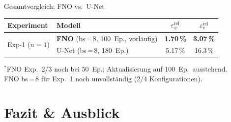 \documentclass[aspectratio=169]{beamer}
\begin{document}
\begin{frame}{Gesamtvergleich: FNO vs.\ U-Net}
  \begin{center}
    \renewcommand{\arraystretch}{1.45}
    \begin{tabular}{llcc}
      \toprule
      Experiment & Modell & $\varepsilon_\psi^{\text{rel}}$ & $\varepsilon_v^{\text{rel}}$ \\
      \midrule
      \multirow{2}{*}{Exp-1 ($n=1$)}
        & \textbf{FNO} (bs\,=\,8, 100~Ep., vorläufig)
          & \textcolor{bestgreen}{\textbf{1.70\,\%}} & \textcolor{bestgreen}{\textbf{3.07\,\%}} \\
        & U-Net (bs\,=\,8, 180~Ep.)
          & 5.17\,\% & 16.3\,\% \\
    \end{tabular}
  \end{center}
  \vspace{4pt}
  \small
  ${}^*$FNO Exp.~2/3 noch bei 50~Ep.; Aktualisierung auf 100~Ep.\ ausstehend.\\
  FNO bs\,=\,8 für Exp.~1 noch unvollständig (2/4 Konfigurationen).
\end{frame}

\section{Fazit \& Ausblick}
\end{document}
